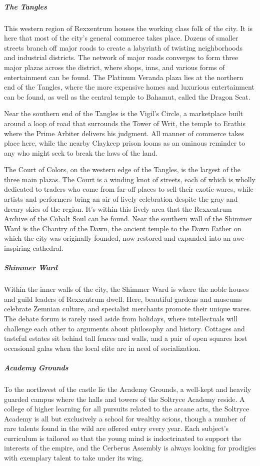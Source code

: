 \documentclass[10pt,a4paper,twoside,bg=print,twocolumn,openany,nodeprecatedcode]{dndbook}
\begin{document}
\subparagraph{The Tangles}
This western region of Rexxentrum houses the working class folk of the city. It is here that most of the city's general commerce takes place. Dozens of smaller streets branch off major roads to create a labyrinth of twisting neighborhoods and industrial districts. The network of major roads converges to form three major plazas across the district, where shops, inns, and various forms of entertainment can be found. The Platinum Veranda plaza lies at the northern end of the Tangles, where the more expensive homes and luxurious entertainment can be found, as well as the central temple to Bahamut, called the Dragon Seat.

Near the southern end of the Tangles is the Vigil's Circle, a marketplace built around a loop of road that surrounds the Tower of Writ, the temple to Erathis where the Prime Arbiter delivers his judgment. All manner of commerce takes place here, while the nearby Claykeep prison looms as an ominous reminder to any who might seek to break the laws of the land.

The Court of Colors, on the western edge of the Tangles, is the largest of the three main plazas. The Court is a winding knot of streets, each of which is wholly dedicated to traders who come from far-off places to sell their exotic wares, while artists and performers bring an air of lively celebration despite the gray and dreary skies of the region. It's within this lively area that the Rexxentrum Archive of the Cobalt Soul can be found. Near the southern wall of the Shimmer Ward is the Chantry of the Dawn, the ancient temple to the Dawn Father on which the city was originally founded, now restored and expanded into an awe-inspiring cathedral.

\subparagraph{Shimmer Ward}
Within the inner walls of the city, the Shimmer Ward is where the noble houses and guild leaders of Rexxentrum dwell. Here, beautiful gardens and museums celebrate Zemnian culture, and specialist merchants promote their unique wares. The debate forum is rarely used aside from holidays, where intellectuals will challenge each other to arguments about philosophy and history. Cottages and tasteful estates sit behind tall fences and walls, and a pair of open squares host occasional galas when the local elite are in need of socialization.

\subparagraph{Academy Grounds}
To the northwest of the castle lie the Academy Grounds, a well-kept and heavily guarded campus where the halls and towers of the Soltryce Academy reside. A college of higher learning for all pursuits related to the arcane arts, the Soltryce Academy is all but exclusively a school for wealthy scions, though a number of rare talents found in the wild are offered entry every year. Each subject's curriculum is tailored so that the young mind is indoctrinated to support the interests of the empire, and the Cerberus Assembly is always looking for prodigies with exemplary talent to take under its wing.
\end{document}
